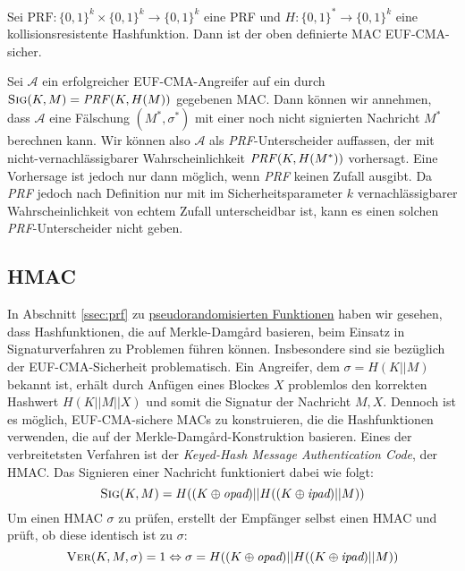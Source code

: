 \begin{theorem}\indexPRF\indexCryptHashFunction Sei
  $\text{PRF}\colon\{0,1\}^k \times \{0,1\}^k \rightarrow \{0,1\}^k$ eine
  PRF und $H \colon \{0,1\}^* \rightarrow \{0,1\}^k$ eine
  kollisionsresistente Hashfunktion.  Dann ist der oben definierte MAC
  EUF-CMA-sicher.
\end{theorem} \vspace{10pt}

\begin{beweis}[Entwurf] Sei $\mathcal{A}$ ein erfolgreicher
  EUF-CMA-Angreifer auf ein durch $\textsc{Sig}(K,M) =
  \text{\textit{PRF}}(K,H(M))$ gegebenen MAC. Dann können wir annehmen,
  dass $\mathcal{A}$ eine Fälschung $(M^*,\sigma^*)$ mit einer noch nicht
  signierten Nachricht $M^*$ berechnen kann. Wir können also $\mathcal{A}$
  als \textit{PRF}-Unterscheider auffassen, der mit
  nicht-vernachlässigbarer Wahrscheinlichkeit
  $\text{\textit{PRF}}(K,H(M^*))$ vorhersagt. Eine Vorhersage ist jedoch
  nur dann möglich, wenn \textit{PRF} keinen Zufall ausgibt. Da
  \textit{PRF} jedoch nach Definition nur mit im Sicherheitsparameter $k$
  vernachlässigbarer Wahrscheinlichkeit von echtem Zufall unterscheidbar
  ist, kann es einen solchen \textit{PRF}-Unterscheider nicht geben.
\end{beweis}


\subsection{HMAC}\label{ssec:hmac} In Abschnitt \ref{ssec:prf} zu
\hyperref[ssec:prf]{pseudorandomisierten Funktionen} haben wir gesehen,
dass Hashfunktionen, die auf Merkle-Damgård basieren, beim Einsatz in
Signaturverfahren zu Problemen führen können. Insbesondere sind sie
bezüglich der EUF-CMA-Sicherheit problematisch.  Ein Angreifer, dem
$\sigma = H(K||M)$ bekannt ist, erhält durch Anfügen eines Blockes $X$
problemlos den korrekten Hashwert $H(K||M||X)$ und somit die Signatur
der Nachricht $M,X$.  Dennoch ist es möglich, EUF-CMA-sichere MACs zu
konstruieren, die die Hashfunktionen verwenden, die auf der
Merkle-Damgård-Konstruktion basieren. Eines der verbreitetsten Verfahren
ist der \textit{Keyed-Hash Message Authentication Code}, der
HMAC\indexHMAC. Das Signieren einer Nachricht funktioniert dabei wie
folgt:
\begin{equation*} \textsc{Sig}(K,M) = H((K \oplus \textit{opad})||H((K
  \oplus\textit{ipad})|| M))
\end{equation*} Um einen HMAC $\sigma$ zu prüfen, erstellt der Empfänger
selbst einen HMAC und prüft, ob diese identisch ist zu $\sigma$:
\[\textsc{Ver} (K, M, \sigma) =1 \Leftrightarrow \sigma = H((K \oplus
  \textit{opad})|| H((K \oplus \textit{ipad})|| M))\]

